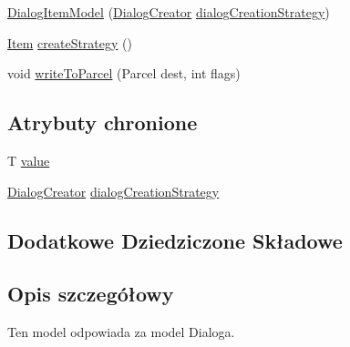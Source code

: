 \begin{DoxyCompactItemize}
\item 
\hyperlink{classpl_1_1edu_1_1uwb_1_1mobiuwb_1_1view_1_1settings_1_1adapter_1_1items_1_1dialog_1_1_dialog_item_model_a3cbd45d5fcd950d99cf80ba891164459}{Dialog\+Item\+Model} (\hyperlink{classpl_1_1edu_1_1uwb_1_1mobiuwb_1_1controls_1_1dialogs_1_1_dialog_creator}{Dialog\+Creator} \hyperlink{classpl_1_1edu_1_1uwb_1_1mobiuwb_1_1view_1_1settings_1_1adapter_1_1items_1_1dialog_1_1_dialog_item_model_a69815392e79418b2ef8dec9eb184be44}{dialog\+Creation\+Strategy})
\item 
\hyperlink{classpl_1_1edu_1_1uwb_1_1mobiuwb_1_1view_1_1settings_1_1adapter_1_1items_1_1_item}{Item} \hyperlink{classpl_1_1edu_1_1uwb_1_1mobiuwb_1_1view_1_1settings_1_1adapter_1_1items_1_1dialog_1_1_dialog_item_model_a9bd6f9bc8ab2e485528e28ac010f6b78}{create\+Strategy} ()
\item 
void \hyperlink{classpl_1_1edu_1_1uwb_1_1mobiuwb_1_1view_1_1settings_1_1adapter_1_1items_1_1dialog_1_1_dialog_item_model_acda52434c922f63187e45a53639bddb8}{write\+To\+Parcel} (Parcel dest, int flags)
\end{DoxyCompactItemize}
\subsection*{Atrybuty chronione}
\begin{DoxyCompactItemize}
\item 
T \hyperlink{classpl_1_1edu_1_1uwb_1_1mobiuwb_1_1view_1_1settings_1_1adapter_1_1items_1_1dialog_1_1_dialog_item_model_a6fc8d7f0a0759f12346fdd34666aaf39}{value}
\item 
\hyperlink{classpl_1_1edu_1_1uwb_1_1mobiuwb_1_1controls_1_1dialogs_1_1_dialog_creator}{Dialog\+Creator} \hyperlink{classpl_1_1edu_1_1uwb_1_1mobiuwb_1_1view_1_1settings_1_1adapter_1_1items_1_1dialog_1_1_dialog_item_model_a69815392e79418b2ef8dec9eb184be44}{dialog\+Creation\+Strategy}
\end{DoxyCompactItemize}
\subsection*{Dodatkowe Dziedziczone Składowe}


\subsection{Opis szczegółowy}
Ten model odpowiada za model Dialoga. 

